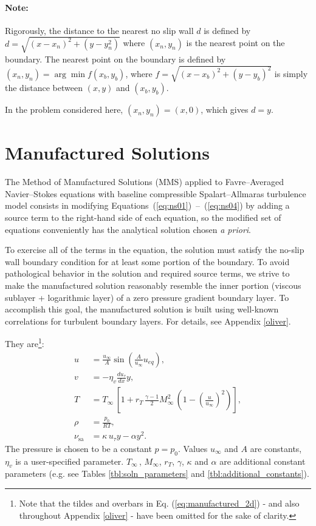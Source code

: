 \documentclass[10pt]{article}
\newcommand{\dd}[2]{\frac{d #1}{d #2}}
\newcommand{\sa}{\nu_{\mathrm{sa}}}
\begin{document}
\paragraph{Note:} Rigorously, the distance to the nearest no slip wall $d$ is defined by $d = \sqrt{(x-x_n)^2 + (y-y_n^2)}$ where $(x_n,y_n)$ is the nearest point on the boundary. The nearest point on the boundary is defined by $(x_n,y_n) = \arg \min f(x_b,y_b)$, where $f = \sqrt{(x-x_b)^2 + (y-y_b)^2}$ is simply the distance between $(x,y)$ and $(x_b,y_b)$.

In the problem considered here, $(x_n,y_n) = (x,0)$, which gives $d=y$.

\section{Manufactured Solutions}

The Method of Manufactured Solutions (MMS) applied to Favre--Averaged Navier--Stokes equations with baseline compressible Spalart--Allmaras turbulence model consists in modifying Equations~(\ref{eq:ns01})~--~(\ref{eq:ns04}) by adding a source term to the right-hand side of each equation, so the modified set of equations conveniently has the analytical solution chosen \textit{a priori}.

To exercise all of the terms in the equation, the
solution must satisfy the no-slip wall boundary condition for at least
some portion of the boundary.  To avoid pathological behavior in the
solution and required source terms, we strive to make the manufactured
solution reasonably resemble the inner portion (viscous sublayer +
logarithmic layer) of a zero pressure gradient boundary layer.  To
accomplish this goal, the manufactured solution is built using
well-known correlations for turbulent boundary layers. For details, see Appendix \ref{oliver}.

They are\footnote{Note that the tildes and overbars in Eq. (\ref{eq:manufactured_2d}) - and also throughout Appendix \ref{oliver} - have been omitted for the sake of clarity.}:
\begin{equation}
\begin{split}\label{eq:manufactured_2d}
u &= \frac{u_{\infty}}{A} \sin \left( \frac{A}{u_{\infty}} u_{eq} \right),\\
v &= -\eta_v \dd{u_{\tau}}{x} y,\\
T &= T_{\infty} \,  \left[ 1 + r_T \, \frac{\gamma - 1}{2} M_{\infty}^2 \, \left( 1 - \left(\frac{u}{u_{\infty}}\right)^2 \right) \right],\\
\rho &= \frac{p_0}{R T},\\
\sa &= \kappa \,  u_{\tau} y - \alpha y^2.
\end{split}
\end{equation}
The pressure is chosen to be a constant $p = p_0$. Values $u_{\infty}$ and $A$ are constants, $\eta_v$ is a user-specified parameter. $T_{\infty} \, $, $M_{\infty}$, $r_T$, $\gamma$, $\kappa $ and $\alpha$ are additional constant parameters (e.g. see Tables \ref{tbl:soln_parameters} and \ref{tbl:additional_constants}). 
\end{document}

